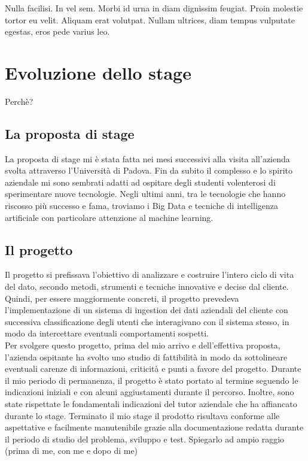 \begin{savequote}[75mm]
Nulla facilisi. In vel sem. Morbi id urna in diam dignissim feugiat. Proin molestie tortor eu velit. Aliquam erat volutpat. Nullam ultrices, diam tempus vulputate egestas, eros pede varius leo.
\end{savequote}

\chapter{Evoluzione dello stage}
Perchè?
\section{La proposta di stage}
La proposta di stage mi è stata fatta nei mesi successivi alla visita all'azienda svolta attraverso l'Università di Padova. Fin da subito il complesso e lo spirito aziendale mi sono sembrati adatti ad ospitare degli studenti volenterosi di sperimentare nuove tecnologie. 
Negli ultimi anni, tra le tecnologie che hanno riscosso più successo e fama, troviamo i Big Data e tecniche di intelligenza artificiale con particolare attenzione al machine learning. 




\section{Il progetto}
Il progetto si prefissava l'obiettivo di analizzare e costruire l'intero ciclo di vita del dato, secondo metodi, strumenti e tecniche innovative e decise dal cliente.
Quindi, per essere maggiormente concreti, il progetto prevedeva l'implementazione di un sistema di \gls{ingestion} dei dati aziendali del cliente con successiva classificazione degli utenti che interagivano con il sistema stesso, in modo da intercettare eventuali comportamenti sospetti.
\\
Per svolgere questo progetto, prima del mio arrivo e dell'effettiva proposta, l'azienda ospitante ha svolto uno studio di fattibilità in modo da sottolineare eventuali carenze di informazioni, criticità e punti a favore del progetto.
Durante il mio periodo di permanenza, il progetto è stato portato al termine seguendo le indicazioni iniziali e con alcuni aggiustamenti durante il percorso. Inoltre, sono state rispettate le fondamentali indicazioni del tutor aziendale che ha affiancato durante lo stage.
Terminato il mio stage il prodotto risultava conforme alle aspettative e facilmente manutenibile grazie alla documentazione redatta durante il periodo di studio del problema, sviluppo e test.
Spiegarlo ad ampio raggio (prima di me, con me e dopo di me)
